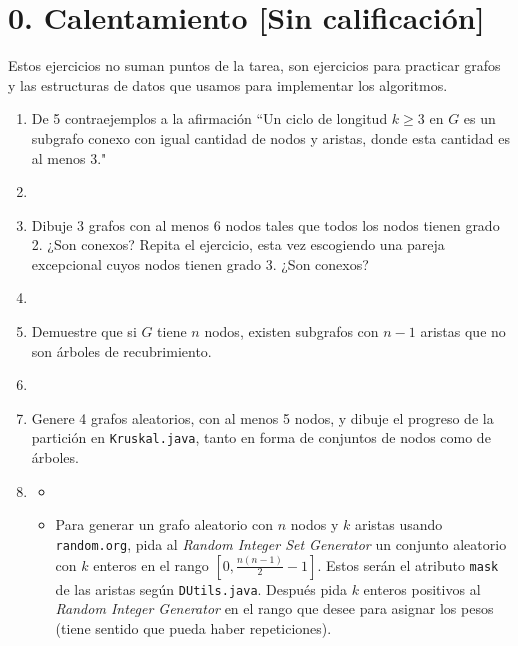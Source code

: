 


\maketitle

\section*{0. Calentamiento [\textbf{Sin calificación}]} Estos ejercicios no suman puntos de la tarea, son ejercicios para practicar grafos y las estructuras de datos que usamos para implementar los algoritmos.

\begin{enumerate}
    \item De 5 contraejemplos a la afirmación ``Un ciclo de longitud $k\geq 3$ en $G$ es un subgrafo conexo con igual cantidad de nodos y aristas, donde esta cantidad es al menos 3."
    \item[] 
    \item Dibuje 3 grafos con al menos 6 nodos tales que todos los nodos tienen grado 2. ¿Son conexos? Repita el ejercicio, esta vez escogiendo una pareja excepcional cuyos nodos tienen grado 3. ¿Son conexos?
    \item[] 
    \item Demuestre que si $G$ tiene $n$ nodos, existen subgrafos con $n-1$ aristas que no son árboles de recubrimiento.
    \item[] 
    \item Genere 4 grafos aleatorios, con al menos 5 nodos, y dibuje el progreso de la partición en \texttt{Kruskal.java}, tanto en forma de conjuntos de nodos como de árboles.
    \item[] \begin{itemize}
        \item[]
        \item[] Para generar un grafo aleatorio con  $n$ nodos y $k$ aristas usando \texttt{random.org}, pida al \emph{Random Integer Set Generator} un conjunto aleatorio con $k$ enteros en el rango $[0, \frac{n(n-1)}{2}-1]$. Estos serán el atributo \texttt{mask} de las aristas según \texttt{DUtils.java}. Después pida $k$ enteros positivos al \emph{Random Integer Generator} en el rango que desee para asignar los pesos (tiene sentido que pueda haber repeticiones).
    \end{itemize} 
\end{enumerate}

